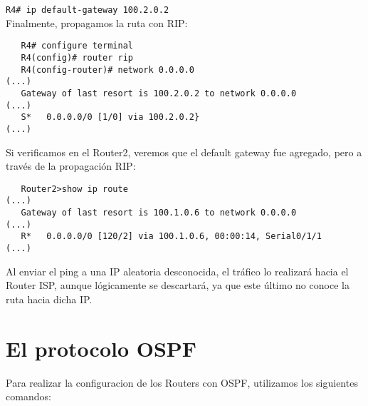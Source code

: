 \documentclass{article}
\begin{document}
\texttt{R4\# ip default-gateway 100.2.0.2} \\

Finalmente, propagamos la ruta con RIP:

\begin{verbatim}
   R4# configure terminal
   R4(config)# router rip
   R4(config-router)# network 0.0.0.0    
(...)
   Gateway of last resort is 100.2.0.2 to network 0.0.0.0
(...)
   S*   0.0.0.0/0 [1/0] via 100.2.0.2}
(...)
\end{verbatim}

Si verificamos en el Router2, veremos que el default gateway fue agregado, pero a trav\'es de la propagaci\'on RIP: \\

\begin{verbatim}
   Router2>show ip route
(...)
   Gateway of last resort is 100.1.0.6 to network 0.0.0.0
(...)
   R*   0.0.0.0/0 [120/2] via 100.1.0.6, 00:00:14, Serial0/1/1
(...)
\end{verbatim}

Al enviar el ping a una IP aleatoria desconocida, el tr\'afico lo realizar\'a hacia el Router ISP, aunque l\'ogicamente se descartar\'a, ya que este \'ultimo no conoce la ruta hacia dicha IP. \\

\section{El protocolo OSPF}

Para realizar la configuracion de los Routers con OSPF, utilizamos los siguientes comandos: \\
\end{document}
